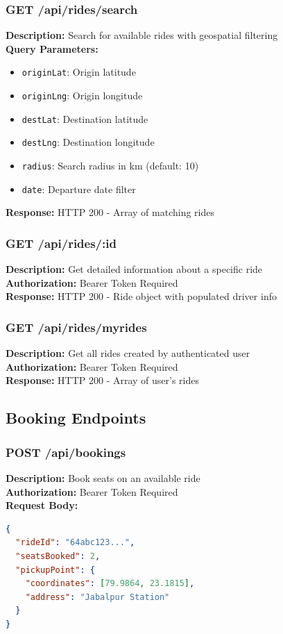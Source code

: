 \documentclass[12pt,a4paper]{article}
\begin{document}
\subsubsection{GET /api/rides/search}
\textbf{Description:} Search for available rides with geospatial filtering\\
\textbf{Query Parameters:}
\begin{itemize}
    \item \texttt{originLat}: Origin latitude
    \item \texttt{originLng}: Origin longitude
    \item \texttt{destLat}: Destination latitude
    \item \texttt{destLng}: Destination longitude
    \item \texttt{radius}: Search radius in km (default: 10)
    \item \texttt{date}: Departure date filter
\end{itemize}

\textbf{Response:} HTTP 200 - Array of matching rides

\subsubsection{GET /api/rides/:id}
\textbf{Description:} Get detailed information about a specific ride\\
\textbf{Authorization:} Bearer Token Required\\
\textbf{Response:} HTTP 200 - Ride object with populated driver info

\subsubsection{GET /api/rides/myrides}
\textbf{Description:} Get all rides created by authenticated user\\
\textbf{Authorization:} Bearer Token Required\\
\textbf{Response:} HTTP 200 - Array of user's rides

\subsection{Booking Endpoints}

\subsubsection{POST /api/bookings}
\textbf{Description:} Book seats on an available ride\\
\textbf{Authorization:} Bearer Token Required\\
\textbf{Request Body:}
\begin{lstlisting}[language=JSON]
{
  "rideId": "64abc123...",
  "seatsBooked": 2,
  "pickupPoint": {
    "coordinates": [79.9864, 23.1815],
    "address": "Jabalpur Station"
  }
}
\end{lstlisting}
\end{document}
